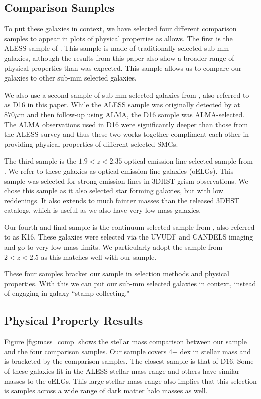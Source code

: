 \documentclass[preprint,natbib209]{aastex}
\begin{document}
\subsection{Comparison Samples}
To put these galaxies in context, we have selected four different comparison samples to appear in plots of physical properties as allows. The first is the ALESS sample of \cite{dacunha15}. This sample is made of traditionally selected sub-mm galaxies, although the results from this paper also show a broader range of physical properties than was expected. This sample allows us to compare our galaxies to other sub-mm selected galaxies.

We also use a second sample of sub-mm selected galaxies from \cite{dunlop16}, also referred to as D16 in this paper. While the ALESS sample was originally detected by at $870 \mu$m and then follow-up using ALMA, the D16 sample was ALMA-selected. The ALMA observations used in D16 were significantly deeper than those from the ALESS survey and thus these two works together compliment each other in providing physical properties of different selected SMGs.

The third sample is the $1.9 < z < 2.35$ optical emission line selected sample from \cite{zeimann14}. We refer to these galaxies as optical emission line galaxies (oELGs). This sample was selected for strong emission lines in 3DHST grism observations. We chose this sample as it also selected star forming galaxies, but with low reddenings. It also extends to much fainter masses than the released 3DHST catalogs, which is useful as we also have very low mass galaxies. 

Our fourth and final sample is the continuum selected sample from \cite{kurczynski16}, also referred to as K16. These galaxies were selected via the UVUDF and CANDELS imaging and go to very low mass limits. We particularly adopt the sample from $2 < z < 2.5$ as this matches well with our sample.

These four samples bracket our sample in selection methods and physical properties. With this we can put our sub-mm selected galaxies in context, instead of engaging in galaxy ``stamp collecting."

\subsection{Physical Property Results}

Figure \ref{fig:mass_comp} shows the stellar mass comparison between our sample and the four comparison samples. Our sample covers 4+ dex in stellar mass and is bracketed by the comparison samples. The closest sample is that of D16. Some of these galaxies fit in the ALESS stellar mass range and others have similar masses to the oELGs. This large stellar mass range also implies that this selection is samples across a wide range of dark matter halo masses as well. 
\end{document}
